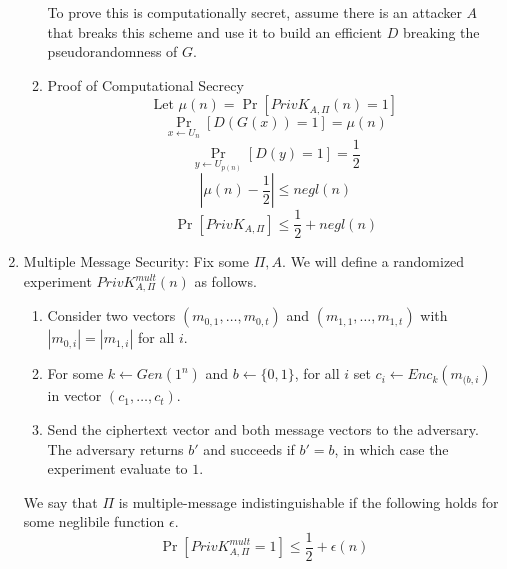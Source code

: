 \documentclass[12pt,letterpaper]{article}
\begin{document}
\begin{enumerate}
\begin{enumerate}
        To prove this is computationally secret, assume there is an attacker $A$ that breaks this scheme and use it to build an efficient $D$ breaking the pseudorandomness of $G$.
            \item Proof of Computational Secrecy
                \[\text{Let }\mu(n)=\Pr[PrivK_{A,\Pi}(n)=1]\]
                \[\Pr_{x\leftarrow U_n}[D(G(x))=1]=\mu(n)\]
            \[\Pr_{y\leftarrow U_{p(n)}}[D(y)=1]=\frac{1}{2}\]
            \[|\mu(n)-\frac{1}{2}|\leq negl(n)\]
            \[\Pr[PrivK_{A,\Pi}]\leq\frac{1}{2}+negl(n)\]
        \end{enumerate}
    \item Multiple Message Security: Fix some $\Pi,A$. We will define a randomized experiment $PrivK^{mult}_{A,\Pi}(n)$ as follows.
                \begin{enumerate}
                    \item Consider two vectors $(m_{0,1},\ldots,m_{0,t})$ and $(m_{1,1},\ldots,m_{1,t})$ with $|m_{0,i}|=|m_{1,i}|$ for all $i$.
                    \item For some $k\leftarrow Gen(1^n)$ and $b\leftarrow\{0,1\}$, for all $i$ set $c_i\leftarrow Enc_k(m_{(b,i})$ in vector $(c_1,\ldots,c_t)$.
                    \item Send the ciphertext vector and both message vectors to the adversary. The adversary returns $b'$ and succeeds if $b'=b$, in which case the experiment evaluate to $1$.            
                \end{enumerate}
                We say that $\Pi$ is multiple-message indistinguishable if the following holds for some neglibile function $\epsilon$.
                \[\Pr[PrivK^{mult}_{A,\Pi}=1]\leq\frac{1}{2}+\epsilon(n)\] \newpage


\end{enumerate}
\end{document}
